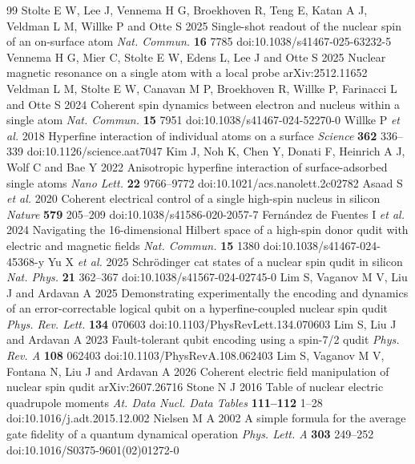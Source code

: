 \documentclass[11pt]{article}
\begin{document}
\begin{thebibliography}{99}
 Stolte E W, Lee J, Vennema H G, Broekhoven R, Teng E, Katan A J, Veldman L M, Willke P and Otte S 2025 Single-shot readout of the nuclear spin of an on-surface atom \emph{Nat. Commun.} \textbf{16} 7785 doi:10.1038/s41467-025-63232-5
 Vennema H G, Mier C, Stolte E W, Edens L, Lee J and Otte S 2025 Nuclear magnetic resonance on a single atom with a local probe arXiv:2512.11652
 Veldman L M, Stolte E W, Canavan M P, Broekhoven R, Willke P, Farinacci L and Otte S 2024 Coherent spin dynamics between electron and nucleus within a single atom \emph{Nat. Commun.} \textbf{15} 7951 doi:10.1038/s41467-024-52270-0
 Willke P \emph{et al.} 2018 Hyperfine interaction of individual atoms on a surface \emph{Science} \textbf{362} 336--339 doi:10.1126/science.aat7047
 Kim J, Noh K, Chen Y, Donati F, Heinrich A J, Wolf C and Bae Y 2022 Anisotropic hyperfine interaction of surface-adsorbed single atoms \emph{Nano Lett.} \textbf{22} 9766--9772 doi:10.1021/acs.nanolett.2c02782
 Asaad S \emph{et al.} 2020 Coherent electrical control of a single high-spin nucleus in silicon \emph{Nature} \textbf{579} 205--209 doi:10.1038/s41586-020-2057-7
 Fern\'andez de Fuentes I \emph{et al.} 2024 Navigating the 16-dimensional Hilbert space of a high-spin donor qudit with electric and magnetic fields \emph{Nat. Commun.} \textbf{15} 1380 doi:10.1038/s41467-024-45368-y
 Yu X \emph{et al.} 2025 Schr\"odinger cat states of a nuclear spin qudit in silicon \emph{Nat. Phys.} \textbf{21} 362--367 doi:10.1038/s41567-024-02745-0
 Lim S, Vaganov M V, Liu J and Ardavan A 2025 Demonstrating experimentally the encoding and dynamics of an error-correctable logical qubit on a hyperfine-coupled nuclear spin qudit \emph{Phys. Rev. Lett.} \textbf{134} 070603 doi:10.1103/PhysRevLett.134.070603
 Lim S, Liu J and Ardavan A 2023 Fault-tolerant qubit encoding using a spin-7/2 qudit \emph{Phys. Rev. A} \textbf{108} 062403 doi:10.1103/PhysRevA.108.062403
 Lim S, Vaganov M V, Fontana N, Liu J and Ardavan A 2026 Coherent electric field manipulation of nuclear spin qudit arXiv:2607.26716
 Stone N J 2016 Table of nuclear electric quadrupole moments \emph{At. Data Nucl. Data Tables} \textbf{111--112} 1--28 doi:10.1016/j.adt.2015.12.002
 Nielsen M A 2002 A simple formula for the average gate fidelity of a quantum dynamical operation \emph{Phys. Lett. A} \textbf{303} 249--252 doi:10.1016/S0375-9601(02)01272-0
\end{thebibliography}
\end{document}
